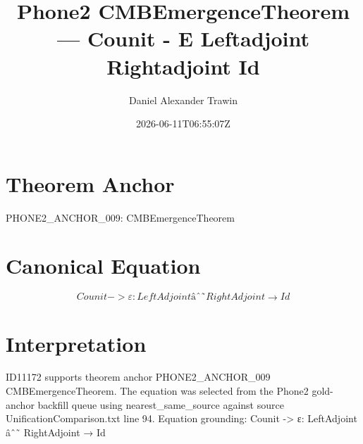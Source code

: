 \documentclass[11pt]{article}
\title{Phone2 CMBEmergenceTheorem — Counit - Ε Leftadjoint Rightadjoint Id}
\author{Daniel Alexander Trawin}
\date{2026-06-11T06:55:07Z}
\begin{document}
\maketitle
\section*{Theorem Anchor}
PHONE2_ANCHOR_009: CMBEmergenceTheorem
\section*{Canonical Equation}
\[
Counit -> ε: LeftAdjoint âˆ˜ RightAdjoint → Id
\]
\section*{Interpretation}
ID11172 supports theorem anchor PHONE2_ANCHOR_009 CMBEmergenceTheorem. The equation was selected from the Phone2 gold-anchor backfill queue using nearest_same_source against source UnificationComparison.txt line 94. Equation grounding: Counit -> ε: LeftAdjoint âˆ˜ RightAdjoint → Id
\end{document}
